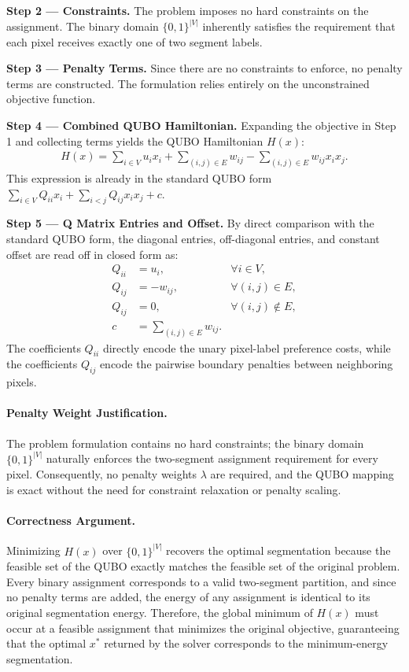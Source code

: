 \documentclass[12pt]{article}
\begin{document}
\textbf{Step 2 --- Constraints.}
The problem imposes no hard constraints on the assignment. The binary domain $\{0,1\}^{|V|}$ inherently satisfies the requirement that each pixel receives exactly one of two segment labels.

\textbf{Step 3 --- Penalty Terms.}
Since there are no constraints to enforce, no penalty terms are constructed. The formulation relies entirely on the unconstrained objective function.

\textbf{Step 4 --- Combined QUBO Hamiltonian.}
Expanding the objective in Step 1 and collecting terms yields the QUBO Hamiltonian $H(x)$:
\begin{align}
    H(x) = \sum_{i \in V} u_i x_i + \sum_{(i,j) \in E} w_{ij} - \sum_{(i,j) \in E} w_{ij} x_i x_j.
\end{align}
This expression is already in the standard QUBO form $\sum_{i \in V} Q_{ii} x_i + \sum_{i < j} Q_{ij} x_i x_j + c$.

\textbf{Step 5 --- Q Matrix Entries and Offset.}
By direct comparison with the standard QUBO form, the diagonal entries, off-diagonal entries, and constant offset are read off in closed form as:
\begin{align}
    Q_{ii} &= u_i, & \forall i \in V, \\
    Q_{ij} &= -w_{ij}, & \forall (i,j) \in E, \\
    Q_{ij} &= 0, & \forall (i,j) \notin E, \\
    c &= \sum_{(i,j) \in E} w_{ij}.
\end{align}
The coefficients $Q_{ii}$ directly encode the unary pixel-label preference costs, while the coefficients $Q_{ij}$ encode the pairwise boundary penalties between neighboring pixels.

\paragraph{Penalty Weight Justification.}
The problem formulation contains no hard constraints; the binary domain $\{0,1\}^{|V|}$ naturally enforces the two-segment assignment requirement for every pixel. Consequently, no penalty weights $\lambda$ are required, and the QUBO mapping is exact without the need for constraint relaxation or penalty scaling.

\paragraph{Correctness Argument.}
Minimizing $H(x)$ over $\{0,1\}^{|V|}$ recovers the optimal segmentation because the feasible set of the QUBO exactly matches the feasible set of the original problem. Every binary assignment corresponds to a valid two-segment partition, and since no penalty terms are added, the energy of any assignment is identical to its original segmentation energy. Therefore, the global minimum of $H(x)$ must occur at a feasible assignment that minimizes the original objective, guaranteeing that the optimal $x^*$ returned by the solver corresponds to the minimum-energy segmentation.
\end{document}
